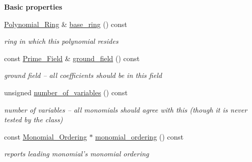 \begin{Indent}\textbf{ Basic properties}\par
\begin{DoxyCompactItemize}
\item 
\mbox{\label{group__polygroup_abf1f531c0004bf37874e98eee42dc0f4}} 
\hyperlink{group__polygroup_class_polynomial___ring}{Polynomial\+\_\+\+Ring} \& \hyperlink{group__polygroup_abf1f531c0004bf37874e98eee42dc0f4}{base\+\_\+ring} () const
\begin{DoxyCompactList}\small\item\em ring in which this polynomial resides \end{DoxyCompactList}\item 
\mbox{\label{group__polygroup_a9569282b79afba5d6393a75844437702}} 
const \hyperlink{group___fields_group_class_prime___field}{Prime\+\_\+\+Field} \& \hyperlink{group__polygroup_a9569282b79afba5d6393a75844437702}{ground\+\_\+field} () const
\begin{DoxyCompactList}\small\item\em ground field -- all coefficients should be in this field \end{DoxyCompactList}\item 
\mbox{\label{group__polygroup_a4419bbe47e14683f2903c47bee8e04af}} 
unsigned \hyperlink{group__polygroup_a4419bbe47e14683f2903c47bee8e04af}{number\+\_\+of\+\_\+variables} () const
\begin{DoxyCompactList}\small\item\em number of variables -- all monomials should agree with this (though it is never tested by the class) \end{DoxyCompactList}\item 
\mbox{\label{group__polygroup_a36a3b3b5132246f9e916b91d8d5a1c76}} 
const \hyperlink{group__orderinggroup_class_monomial___ordering}{Monomial\+\_\+\+Ordering} $\ast$ \hyperlink{group__polygroup_a36a3b3b5132246f9e916b91d8d5a1c76}{monomial\+\_\+ordering} () const
\begin{DoxyCompactList}\small\item\em reports leading monomial's monomial ordering \end{DoxyCompactList}\item 
\mbox{\label{group__polygroup_a9186ed0f55c5cc4ecb1b9bc11ba9f679}} 

\end{DoxyCompactItemize}
\end{Indent}

